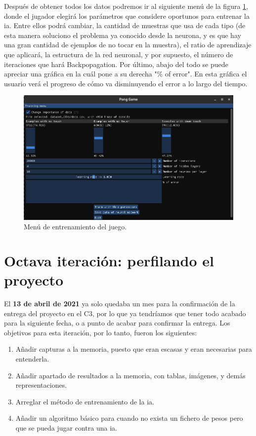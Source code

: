 Después de obtener todos los datos podremos ir al siguiente menú de la figura \ref{Menu de entrenamiento}, donde el jugador elegirá los parámetros que considere oportunos para entrenar la \gls{ia}. Entre ellos podrá cambiar, la cantidad de muestras que usa de cada tipo (de esta manera soluciono el problema ya conocido desde la neurona, y es que hay una gran cantidad de ejemplos de no tocar en la muestra), el ratio de aprendizaje que aplicará, la estructura de la red neuronal, y por supuesto, el número de iteraciones que hará Backpopagation. Por último, abajo del todo se puede apreciar una gráfica en la cuál pone a su derecha "\% of error". En esta gráfica el usuario verá el progreso de cómo va disminuyendo el error a lo largo del tiempo.
\begin{figure}[H]
	\centering
	\includegraphics[width=15cm]{archivos/imagenes/menu-de-entrenamiento.png}
	\caption{Menú de entrenamiento del juego.}
	\label{Menu de entrenamiento}
\end{figure}

\section{Octava iteración: perfilando el proyecto}
\label{octava iteracion}
El \textbf{13 de abril de 2021} ya solo quedaba un mes para la confirmación de la entrega del proyecto en el C3, por lo que ya tendríamos que tener todo acabado para la siguiente fecha, o a punto de acabar para confirmar la entrega. Los objetivos para esta iteración, por lo tanto, fueron los siguientes:
\begin{enumerate}
	\item Añadir capturas a la memoria, puesto que eran escasas y eran necesarias para entenderla.
	\item Añadir apartado de resultados a la memoria, con tablas, imágenes, y demás representaciones.
	\item Arreglar el método de entrenamiento de la \gls{ia}.
	\item Añadir un algoritmo básico para cuando no exista un fichero de pesos pero que se pueda jugar contra una \gls{ia}.
\end{enumerate}

